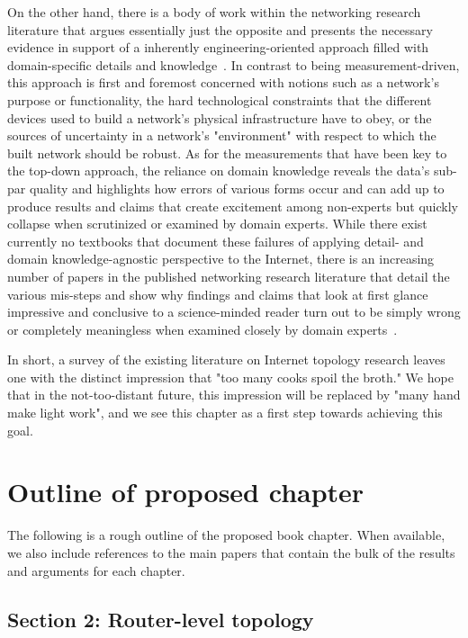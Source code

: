 \documentclass{sig-alternate-10pt}
\begin{document}
On the other hand, there is a body of work within the networking research literature that argues essentially just the opposite and presents the necessary evidence in support of a inherently engineering-oriented approach filled with domain-specific details and knowledge~\cite{our1,our2,our3}. In contrast to being measurement-driven, this approach is first and foremost concerned with notions such as a network's purpose or functionality, the hard technological constraints that the different devices used to build a network's physical infrastructure have to obey, or the sources of uncertainty in a network's "environment" with respect to which the built network should be robust.  As for the measurements that have been key to the top-down approach, the reliance on domain knowledge reveals the data's sub-par quality and highlights how errors of various forms occur and can add up to produce results and claims that create excitement among non-experts but quickly collapse when scrutinized or examined by domain experts. While there exist currently no textbooks that document these failures of applying detail- and domain knowledge-agnostic perspective to the Internet, there is an increasing number of papers in the published networking research literature that detail the various mis-steps and show why findings and claims that look at first glance impressive and conclusive to a science-minded reader turn out to be simply wrong or completely meaningless when examined closely by domain experts~\cite{alderson1,alderson2,bala1}.

In short, a survey of the existing literature on Internet topology research leaves one with the distinct impression that "too many cooks spoil the broth."  We hope that in the 
not-too-distant future, this impression will be replaced by "many hand make light work", and we see this chapter as a first step towards achieving this goal.

\section{Outline of proposed chapter}

The following is a rough outline of the proposed book chapter. When available, we also include references to the main papers that contain the bulk of the results and arguments for each chapter. 

\subsection*{Section 2: Router-level topology}
\end{document}
